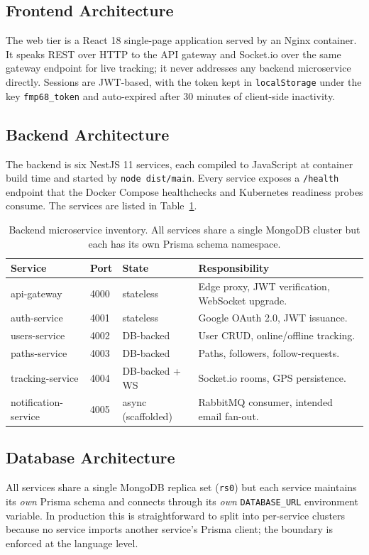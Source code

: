 \documentclass[11pt,a4paper]{article}
\begin{document}
\subsection{Frontend Architecture}
The web tier is a React 18 single-page application served by an Nginx
container.  It speaks REST over HTTP to the API gateway and Socket.io
over the same gateway endpoint for live tracking; it never addresses
any backend microservice directly.  Sessions are JWT-based, with the
token kept in \texttt{localStorage} under the key \texttt{fmp68\_token}
and auto-expired after 30 minutes of client-side inactivity.

\subsection{Backend Architecture}
The backend is six NestJS 11 services, each compiled to JavaScript at
container build time and started by \texttt{node dist/main}.  Every
service exposes a \texttt{/health} endpoint that the Docker Compose
healthchecks and Kubernetes readiness probes consume.  The services
are listed in Table~\ref{tab:services}.

\begin{table}[h]
\centering
\small
\begin{tabularx}{\textwidth}{l l l X}
\toprule
\textbf{Service} & \textbf{Port} & \textbf{State} & \textbf{Responsibility} \\
\midrule
api-gateway          & 4000 & stateless          & Edge proxy, JWT verification, WebSocket upgrade. \\
auth-service         & 4001 & stateless          & Google OAuth 2.0, JWT issuance. \\
users-service        & 4002 & DB-backed          & User CRUD, online/offline tracking. \\
paths-service        & 4003 & DB-backed          & Paths, followers, follow-requests. \\
tracking-service     & 4004 & DB-backed + WS     & Socket.io rooms, GPS persistence. \\
notification-service & 4005 & async (scaffolded) & RabbitMQ consumer, intended email fan-out. \\
\bottomrule
\end{tabularx}
\caption{Backend microservice inventory.  All services share a single
MongoDB cluster but each has its own Prisma schema namespace.}
\label{tab:services}
\end{table}

\subsection{Database Architecture}
All services share a single MongoDB replica set (\texttt{rs0}) but each
service maintains its \emph{own} Prisma schema and connects through
its \emph{own} \texttt{DATABASE\_URL} environment variable.  In
production this is straightforward to split into per-service clusters
because no service imports another service's Prisma client; the
boundary is enforced at the language level.
\end{document}
